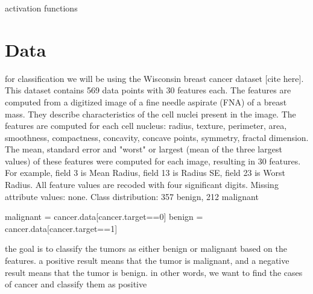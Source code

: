 \documentclass[twoside,11pt]{report}
\begin{document}
activation functions




\section{Data}
\label{sec:data}
for classification we will be using the Wisconsin breast cancer dataset [cite here]. This dataset contains 569 data points
with 30 features each. The features are computed from a digitized image of a fine needle aspirate (FNA) of a breast mass.
They describe characteristics of the cell nuclei present in the image. The features are computed for each cell nucleus:
radius, texture, perimeter, area, smoothness, compactness, concavity, concave points, symmetry, fractal dimension.
The mean, standard error and "worst" or largest (mean of the three largest values) of these features were computed for each image,
resulting in 30 features. For example, field 3 is Mean Radius, field 13 is Radius SE, field 23 is Worst Radius.
All feature values are recoded with four significant digits. Missing attribute values: none.
Class distribution: 357 benign, 212 malignant

malignant = cancer.data[cancer.target==0]
benign = cancer.data[cancer.target==1]

the goal is to classify the tumors as either benign or malignant based on the features.
a positive result means that the tumor is malignant, and a negative result means that the tumor is benign.
in other words, we want to find the cases of cancer and classify them as positive
\end{document}
